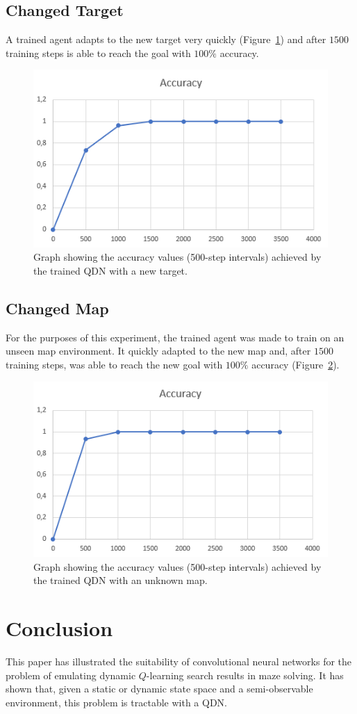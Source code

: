 \documentclass{article}
\begin{document}
\subsection{Changed Target}
A trained agent adapts to the new target very quickly (Figure~\ref{fig:accuracy_new}) and after $1500$ training steps is able to reach the goal with $100\%$ accuracy.
\begin{figure}[ht!]
\centering
  \includegraphics[width=0.8\linewidth]{accuracy_new}
  \caption{Graph showing the accuracy values (500-step intervals) achieved by the trained QDN with a new target.}
  \label{fig:accuracy_new}
\end{figure}
\subsection{Changed Map}
For the purposes of this experiment, the trained agent was made to train on an unseen map environment. It quickly adapted to the new map and, after $1500$ training steps, was able to reach the new goal with $100\%$ accuracy (Figure~\ref{fig:accuracy_T}).

\begin{figure}[ht!]
\centering
  \includegraphics[width=0.8\linewidth]{accuracy_T}
  \caption{Graph showing the accuracy values (500-step intervals) achieved by the trained QDN with an unknown map.}
  \label{fig:accuracy_T}
\end{figure}

\section{Conclusion}
This paper has illustrated the suitability of convolutional neural networks for the problem of emulating dynamic $Q$-learning search results in maze solving. It has shown that, given a static or dynamic state space and a semi-observable environment, this problem is tractable with a QDN.
\end{document}
